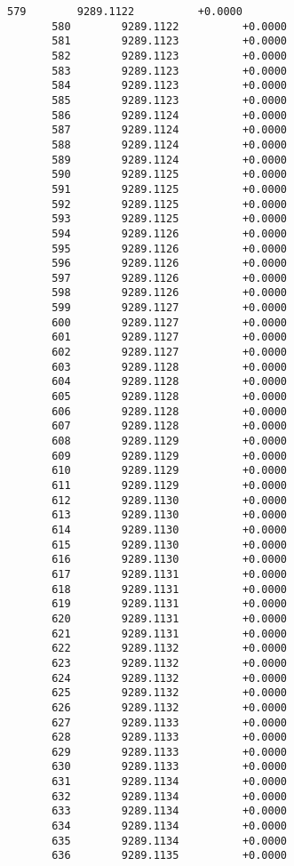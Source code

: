 \documentclass[11pt]{article}
\begin{document}
\begin{Verbatim}[commandchars=\\\{\}]
       579        9289.1122          +0.0000
       580        9289.1122          +0.0000
       581        9289.1123          +0.0000
       582        9289.1123          +0.0000
       583        9289.1123          +0.0000
       584        9289.1123          +0.0000
       585        9289.1123          +0.0000
       586        9289.1124          +0.0000
       587        9289.1124          +0.0000
       588        9289.1124          +0.0000
       589        9289.1124          +0.0000
       590        9289.1125          +0.0000
       591        9289.1125          +0.0000
       592        9289.1125          +0.0000
       593        9289.1125          +0.0000
       594        9289.1126          +0.0000
       595        9289.1126          +0.0000
       596        9289.1126          +0.0000
       597        9289.1126          +0.0000
       598        9289.1126          +0.0000
       599        9289.1127          +0.0000
       600        9289.1127          +0.0000
       601        9289.1127          +0.0000
       602        9289.1127          +0.0000
       603        9289.1128          +0.0000
       604        9289.1128          +0.0000
       605        9289.1128          +0.0000
       606        9289.1128          +0.0000
       607        9289.1128          +0.0000
       608        9289.1129          +0.0000
       609        9289.1129          +0.0000
       610        9289.1129          +0.0000
       611        9289.1129          +0.0000
       612        9289.1130          +0.0000
       613        9289.1130          +0.0000
       614        9289.1130          +0.0000
       615        9289.1130          +0.0000
       616        9289.1130          +0.0000
       617        9289.1131          +0.0000
       618        9289.1131          +0.0000
       619        9289.1131          +0.0000
       620        9289.1131          +0.0000
       621        9289.1131          +0.0000
       622        9289.1132          +0.0000
       623        9289.1132          +0.0000
       624        9289.1132          +0.0000
       625        9289.1132          +0.0000
       626        9289.1132          +0.0000
       627        9289.1133          +0.0000
       628        9289.1133          +0.0000
       629        9289.1133          +0.0000
       630        9289.1133          +0.0000
       631        9289.1134          +0.0000
       632        9289.1134          +0.0000
       633        9289.1134          +0.0000
       634        9289.1134          +0.0000
       635        9289.1134          +0.0000
       636        9289.1135          +0.0000

\end{Verbatim}
\end{document}
